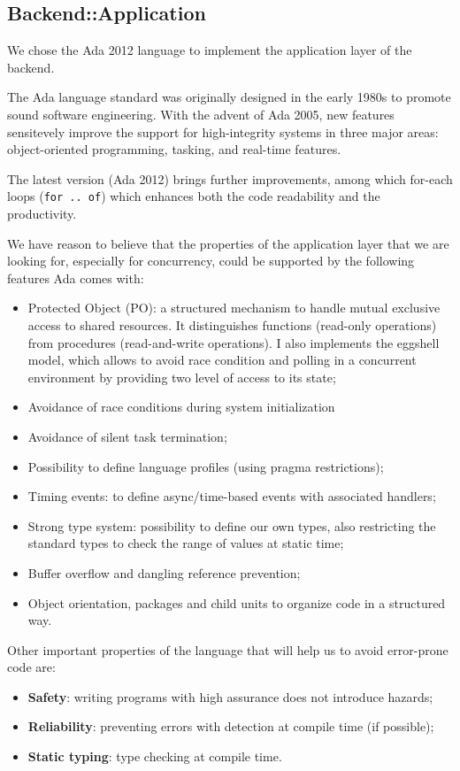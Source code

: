 \subsection{Backend::Application}
We chose the Ada 2012 language to implement the application layer of the
backend.

The Ada language standard was originally designed in the early 1980s to promote
sound software engineering. With the advent of Ada 2005, new features
sensitevely improve the support for high-integrity systems in three major
areas: object-oriented programming, tasking, and real-time features.

The latest version (Ada 2012) brings further improvements, among which for-each
loops (\texttt{for .. of}) which enhances both the code readability and the
productivity.

We have reason to believe that the properties of the application layer
that we are looking for, especially for concurrency, could be supported by the
following features Ada comes with:
\begin{itemize}
  \item Protected Object (PO): a structured mechanism to handle
        mutual exclusive access to shared resources.
        It distinguishes functions (read-only
        operations) from procedures (read-and-write operations). I also
        implements the eggshell model, which allows to avoid race condition and
        polling in a concurrent environment by providing two level of access
        to its state;
  \item Avoidance of race conditions during system initialization
  \item Avoidance of silent task termination;
  \item Possibility to define language profiles (using pragma restrictions);
  \item Timing events: to define async/time-based events with associated
        handlers;
  \item Strong type system: possibility to define our own types, also restricting
  the standard types to check the range of values at static time;
  \item Buffer overflow and dangling reference prevention;
  \item Object orientation, packages and child units to organize code in a
  structured way.
\end{itemize}

Other important properties of the language that will help us to avoid
error-prone code are:
\begin{itemize}
  \item \textbf{Safety}: writing programs with high assurance does not
        introduce hazards;
  \item \textbf{Reliability}: preventing errors with detection at compile time
        (if possible);
  \item \textbf{Static typing}: type checking at compile time.
\end{itemize}

